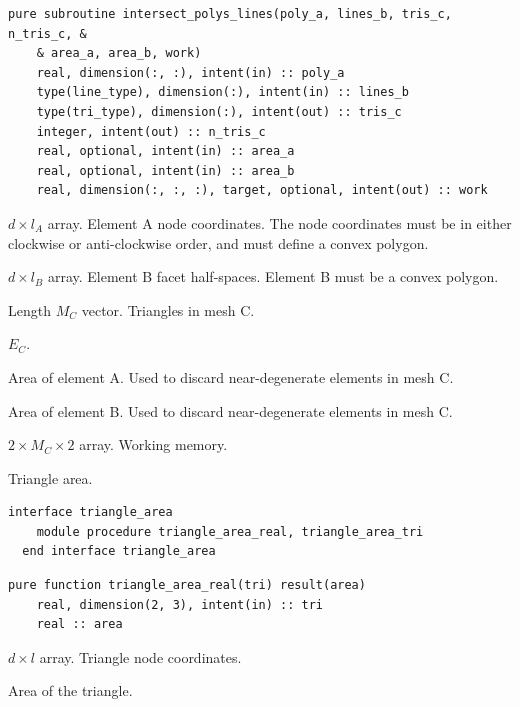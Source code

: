\documentclass{article}
\begin{document}
\begin{lstlisting}[language=FORTRAN]
  pure subroutine intersect_polys_lines(poly_a, lines_b, tris_c, n_tris_c, &
    & area_a, area_b, work)
    real, dimension(:, :), intent(in) :: poly_a
    type(line_type), dimension(:), intent(in) :: lines_b
    type(tri_type), dimension(:), intent(out) :: tris_c
    integer, intent(out) :: n_tris_c
    real, optional, intent(in) :: area_a
    real, optional, intent(in) :: area_b
    real, dimension(:, :, :), target, optional, intent(out) :: work
\end{lstlisting}

\begin{description}[font=\ttfamily\bfseries,leftmargin=2.2\parindent,labelindent=1.7\parindent,noitemsep]
  \item[poly\_a] $d \times l_A$ array. Element A node coordinates. The node
    coordinates must be in either clockwise or anti-clockwise order, and must
    define a convex polygon.
  \item[lines\_b] $d \times l_B$ array. Element B facet half-spaces. Element B
    must be a convex polygon.
  \item[tris\_c] Length $M_C$ vector. Triangles in mesh C.
  \item[n\_tris\_c] $E_C$.
  \item[area\_a] Area of element A. Used to discard near-degenerate elements in
    mesh C.
  \item[area\_b] Area of element B. Used to discard near-degenerate elements in
    mesh C.
  \item[work] $2 \times M_C \times 2$ array. Working memory.
\end{description}

\noindent Triangle area.

\begin{lstlisting}[language=FORTRAN]
  interface triangle_area
    module procedure triangle_area_real, triangle_area_tri
  end interface triangle_area
\end{lstlisting}

\begin{lstlisting}[language=FORTRAN]
  pure function triangle_area_real(tri) result(area)
    real, dimension(2, 3), intent(in) :: tri
    real :: area
\end{lstlisting}

\begin{description}[font=\ttfamily\bfseries,leftmargin=2.2\parindent,labelindent=1.7\parindent,noitemsep]
  \item[tri] $d \times l$ array. Triangle node coordinates.
  \item[area] Area of the triangle.
\end{description}
\end{document}
